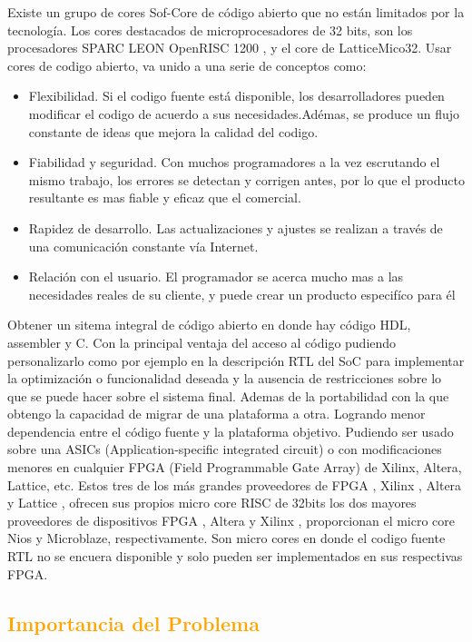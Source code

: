 \documentclass[a4paper,11pt]{article}
\begin{document}
Existe un grupo de cores Sof-Core de código abierto que no están limitados por la tecnología. Los cores destacados de microprocesadores de 32 bits, son los procesadores SPARC LEON OpenRISC 1200 , y el core de LatticeMico32. Usar cores de  codigo abierto,  va unido a una serie de conceptos como:
 \begin {itemize}
\item Flexibilidad. Si el codigo fuente está disponible, los desarrolladores pueden modificar el codigo de acuerdo a sus necesidades.Adémas, se produce un flujo constante de ideas que mejora la calidad del codigo.
\item Fiabilidad y seguridad. Con muchos programadores a la vez escrutando el mismo trabajo, los errores se detectan y corrigen antes, por lo que el producto resultante es mas fiable y eficaz que el comercial.
\item Rapidez de desarrollo. Las actualizaciones y ajustes se realizan a través de una comunicación constante vía Internet.
\item Relación con el usuario. El programador se acerca mucho mas a las necesidades reales de su cliente, y puede crear un producto especifíco para él
 \end {itemize}
 
Obtener un sitema integral de código abierto en donde hay código HDL, assembler y C. Con la principal ventaja del acceso al código pudiendo personalizarlo como por ejemplo en la descripción RTL del SoC para implementar la optimización o funcionalidad deseada y la ausencia de restricciones sobre lo que se puede hacer sobre el sistema final. Ademas de la portabilidad con la que obtengo la capacidad de migrar de una plataforma a otra. Logrando menor dependencia entre el código fuente y la plataforma objetivo. Pudiendo ser usado sobre una ASICs (Application-specific integrated circuit) o con modificaciones menores en cualquier FPGA (Field Programmable Gate Array) de Xilinx, Altera, Lattice, etc. 
Estos tres de los más grandes proveedores de FPGA , Xilinx , Altera y Lattice , ofrecen sus propios micro core RISC de 32bits los dos mayores proveedores de dispositivos FPGA , Altera y Xilinx , proporcionan el micro core Nios y Microblaze, respectivamente. Son micro cores  en donde el codigo fuente RTL no se encuera disponible y solo pueden ser implementados en sus respectivas FPGA.

\subsection{\textcolor{orange}{Importancia del Problema}}
\end{document}
